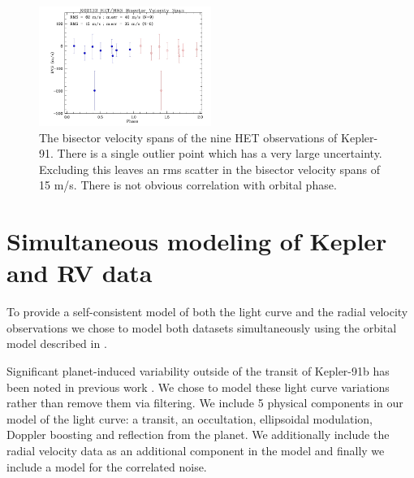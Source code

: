 \documentclass[apjl]{emulateapj}
\begin{document}

\begin{figure}
\includegraphics[width=0.50\textwidth]{k02133_bvs_phas1.jpg}
\caption{The bisector velocity spans of the nine HET observations of Kepler-91. There is a single outlier point which has a very large uncertainty. Excluding this leaves an rms scatter in the bisector velocity spans of 15 m/s. There is not obvious correlation with orbital phase.}
\label{fig:bisectors}
\end{figure}


\section{Simultaneous modeling of Kepler and RV data}
To provide a self-consistent model of both the light curve and the radial velocity observations we chose to model both datasets simultaneously using the orbital model described in \citet{rowe14}.

Significant planet-induced variability outside of the transit of Kepler-91b has been noted in previous work \citep{lillo14,esteves13}. We chose to model these light curve variations rather than remove them via filtering.  We include 5 physical components in our model of the light curve: a transit, an occultation, ellipsoidal modulation, Doppler boosting and reflection from the planet. We additionally include the radial velocity data as an additional component in the model and finally we include a model for the correlated noise.
\end{document}
